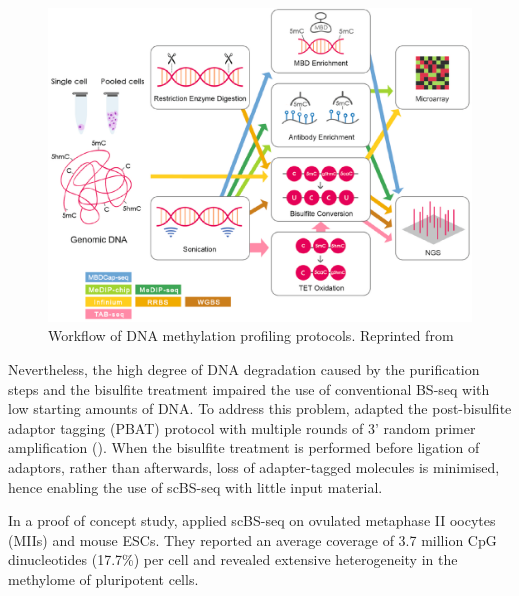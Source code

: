 \begin{figure}[H]
	\centering
	\includegraphics[width=0.8\linewidth]{methylation_protocols}
	\caption[]{Workflow of DNA methylation profiling protocols. Reprinted from \cite{Yong2016}}
	\label{fig:methylation_protocols}
\end{figure}

Nevertheless, the high degree of DNA degradation caused by the purification steps and the bisulfite treatment impaired the use of conventional BS-seq with low starting amounts of DNA. To address this problem, \cite{Smallwood2014} adapted the post-bisulfite adaptor tagging (PBAT) protocol with multiple rounds of 3' random primer amplification (). When the bisulfite treatment is performed before ligation of adaptors, rather than afterwards, loss of adapter-tagged molecules is minimised, hence enabling the use of scBS-seq with little input material.

In a proof of concept study, \cite{Smallwood2014} applied scBS-seq on ovulated metaphase II oocytes (MIIs) and mouse ESCs. They reported an average coverage of 3.7 million CpG dinucleotides (17.7\%) per cell and revealed extensive heterogeneity in the methylome of pluripotent cells.

